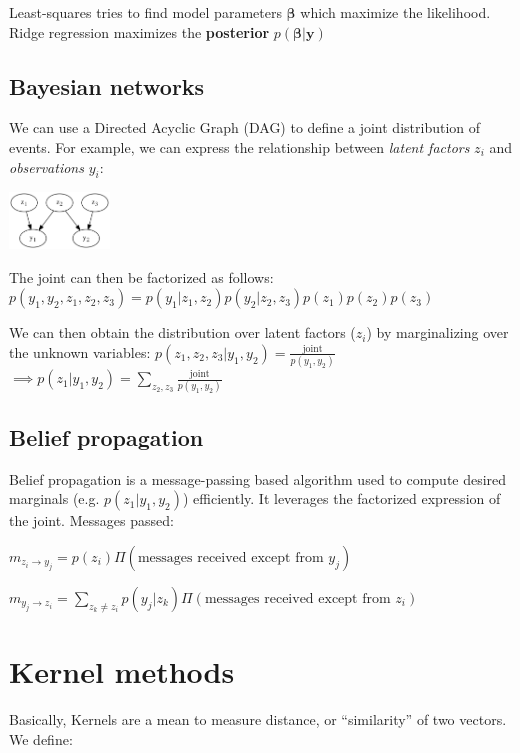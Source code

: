 \documentclass[10pt,a4paper,landscape]{article}
\providecommand{\bf}[1]{\ensuremath{\mathbf{#1}}}
\begin{document}
\begin{multicols*}{4}
Least-squares tries to find model parameters $\bf{\beta}$ which maximize the likelihood. Ridge regression maximizes the \textbf{posterior} $p(\bf{\beta}|\bf{y})$

\subsection{Bayesian networks}
We can use a Directed Acyclic Graph (DAG) to define a joint distribution of events. For example, we can express the relationship between \textit{latent factors} $z_i$ and \textit{observations} $y_i$:

\begin{colfig}
  \centering
  \includegraphics[height=1.5cm]{images/bayesian-network.png}
\end{colfig}

The joint can then be factorized as follows:
$p(y_1, y_2, z_1, z_2, z_3) = p(y_1 | z_1, z_2) p(y_2 | z_2, z_3) p(z_1) p(z_2) p(z_3)$

We can then obtain the distribution over latent factors ($z_i$) by marginalizing over the unknown variables:
$p(z_1, z_2, z_3 | y_1, y_2) = \frac{\text{joint}}{p(y_1, y_2)}$\\
$\implies p(z_1 | y_1, y_2) = \sum_{z_2, z_3} \frac{\text{joint}}{p(y_1, y_2)}$

\subsection{Belief propagation}
Belief propagation is a message-passing based algorithm used to compute desired marginals (e.g. $p(z_1 | y_1, y_2)$) efficiently. It leverages the factorized expression of the joint. Messages passed:

$m_{z_i \rightarrow y_j} = p(z_i) \Pi(\text{messages received except from } y_j)$

$m_{y_j \rightarrow z_i} = \sum_{z_k \neq z_i} p(y_j | z_k) \Pi(\text{messages received except from } z_i)$

\section{Kernel methods}
Basically, Kernels are a mean to measure distance, or ``similarity'' of two vectors. We define:


\end{multicols*}
\end{document}
